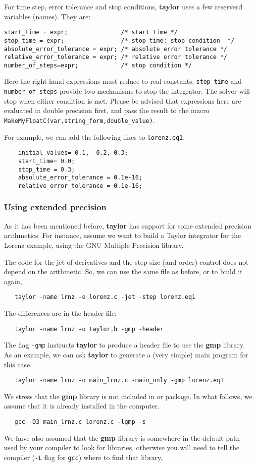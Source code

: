 \documentclass{article}
\begin{document}
For time step, error tolerance and stop conditions,
{\bf taylor} uses a few reserverd variables (names).
They are:
\begin{verbatim}
start_time = expr;               /* start time */
stop_time = expr;                /* stop time: stop condition  */
absolute_error_tolerance = expr; /* absolute error tolerance */
relative_error_tolerance = expr; /* relative error tolerance */
number_of_steps=expr;            /* stop condition */
\end{verbatim}
Here the right hand expressions must reduce to 
real constants. \verb+stop_time+ and \verb+number_of_steps+
provide two mechanisms to stop the integrator. The 
solver will stop when either condition is met. 
Please be advised that expressions here are evaluated
in double precision first, and pass the result to
the macro \verb+MakeMyFloatC(var,string_form,double_value)+.

For example, we can add the following lines to 
\verb+lorenz.eq1+.
\begin{verbatim}
    initial_values= 0.1,  0.2, 0.3;
    start_time= 0.0;
    stop_time = 0.3;
    absolute_error_tolerance = 0.1e-16;
    relative_error_tolerance = 0.1e-16;
\end{verbatim}

\subsubsection{Using extended precision}
As it has been mentioned before, {\bf taylor} has support for some
extended precision arithmetics. For instance, assume we want to build
a Taylor integrator for the Lorenz example, using the GNU Multiple
Precision library.

The code for the jet of derivatives and the step size (and order)
control does not depend on the arithmetic. So, we can use the same
file as before, or to build it again,
\begin{verbatim}
   taylor -name lrnz -o lorenz.c -jet -step lorenz.eq1
\end{verbatim}
The differences are in the header file:
\begin{verbatim}
   taylor -name lrnz -o taylor.h -gmp -header
\end{verbatim}
The flag {\tt -gmp} instructs {\bf taylor} to produce a header file to
use the {\bf gmp} library. As an example, we can ask {\bf taylor} to
generate a (very simple) main program for this case,
\begin{verbatim}
   taylor -name lrnz -o main_lrnz.c -main_only -gmp lorenz.eq1
\end{verbatim}
We stress that the {\bf gmp} library is not included in or package. In
what follows, we assume that it is already installed in the computer.
\begin{verbatim}
   gcc -O3 main_lrnz.c lorenz.c -lgmp -s
\end{verbatim}
We have also assumed that the {\bf gmp} library is somewhere in the
default path used by your compiler to look for libraries, otherwise
you will need to tell the compiler ({\tt -L} flag for {\tt gcc}) where
to find that library.
\end{document}
